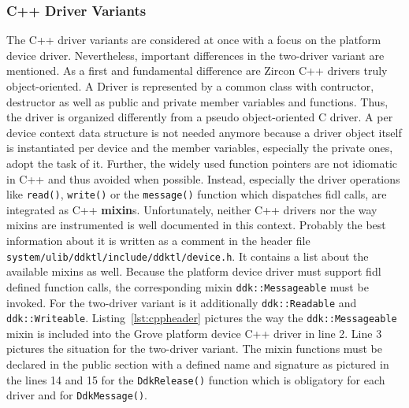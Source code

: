 \subsubsection*{C++ Driver Variants}
The C++ driver variants are considered at once with a focus on the platform device driver.
Nevertheless, important differences in the two-driver variant are mentioned.
As a first and fundamental difference are Zircon C++ drivers truly object-oriented.
A Driver is represented by a common class with contructor, destructor as well as public and private member variables and functions.
Thus, the driver is organized differently from a pseudo object-oriented C driver.
A per device context data structure is not needed anymore because a driver object itself is instantiated per device and the member variables, especially the private ones, adopt the task of it.  
Further, the widely used function pointers are not idiomatic in C++ and thus avoided when possible.
Instead, especially the driver operations like \texttt{read()}, \texttt{write()} or the \texttt{message()} function which dispatches \ac{fidl} calls, are integrated as C++ \textbf{mixin}s.
Unfortunately, neither C++ drivers nor the way mixins are instrumented is well documented in this context.
Probably the best information about it is written as a comment in the header file \texttt{system/ulib/ddktl/include/ddktl/device.h}.
It contains a list about the available mixins as well.
Because the platform device driver must support \ac{fidl} defined function calls, the corresponding mixin \texttt{ddk::Messageable} must be invoked.
For the two-driver variant is it additionally \texttt{ddk::Readable} and \texttt{ddk::Writeable}.
Listing~\ref{lst:cppheader} pictures the way the \texttt{ddk::Messageable} mixin is included into the Grove platform device C++ driver in line 2.
Line 3 pictures the situation for the two-driver variant.
The mixin functions must be declared in the public section with a defined name and signature as pictured in the lines 14 and 15 for the \texttt{DdkRelease()} function which is obligatory for each driver and for \texttt{DdkMessage()}.

